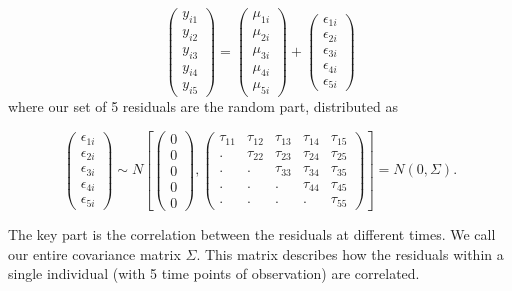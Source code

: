 \documentclass[
  letterpaper,
  DIV=11,
  numbers=noendperiod]{scrreprt}
\begin{document}
\[\begin{pmatrix}y_{i1}\\
y_{i2}\\
y_{i3}\\
y_{i4}\\
y_{i5}
\end{pmatrix} = \left(\begin{array}{c}
\mu_{1i}\\
\mu_{2i}\\
\mu_{3i}\\
\mu_{4i}\\
\mu_{5i}
\end{array}\right) + \left(\begin{array}{c}
\epsilon_{1i}\\
\epsilon_{2i}\\
\epsilon_{3i}\\
\epsilon_{4i}\\
\epsilon_{5i}
\end{array}\right)\] where our set of 5 residuals are the random part,
distributed as

\[\left(\begin{array}{c}
\epsilon_{1i}\\
\epsilon_{2i}\\
\epsilon_{3i}\\
\epsilon_{4i}\\
\epsilon_{5i}
\end{array}\right)\sim N\left[\left(\begin{array}{c}
0\\
0\\
0\\
0\\
0
\end{array}\right),\left(\begin{array}{ccccc}
\tau_{11} & \tau_{12} & \tau_{13} & \tau_{14} & \tau_{15}\\
. & \tau_{22} & \tau_{23}& \tau_{24} & \tau_{25}\\
. & . & \tau_{33}& \tau_{34} & \tau_{35}\\
. & . & . & \tau_{44} & \tau_{45}\\
. & . & . & . & \tau_{55}
\end{array}\right)\right] = N( 0, \Sigma ). \]

The key part is the correlation between the residuals at different
times. We call our entire covariance matrix \(\Sigma\). This matrix
describes how the residuals within a single individual (with 5 time
points of observation) are correlated.
\end{document}
